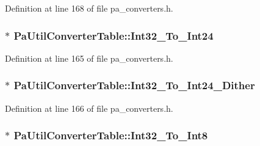 Definition at line 168 of file pa\+\_\+converters.\+h.

\subsubsection[{\texorpdfstring{Int32\+\_\+\+To\+\_\+\+Int24}{Int32_To_Int24}}]{$\ast$ Pa\+Util\+Converter\+Table\+::\+Int32\+\_\+\+To\+\_\+\+Int24}\hypertarget{struct_pa_util_converter_table_a374be7d29ed710b488d0980e540a3823}{}\label{struct_pa_util_converter_table_a374be7d29ed710b488d0980e540a3823}


Definition at line 165 of file pa\+\_\+converters.\+h.

\subsubsection[{\texorpdfstring{Int32\+\_\+\+To\+\_\+\+Int24\+\_\+\+Dither}{Int32_To_Int24_Dither}}]{$\ast$ Pa\+Util\+Converter\+Table\+::\+Int32\+\_\+\+To\+\_\+\+Int24\+\_\+\+Dither}\hypertarget{struct_pa_util_converter_table_a2e120380bc1f476c88805f4425eda05c}{}\label{struct_pa_util_converter_table_a2e120380bc1f476c88805f4425eda05c}


Definition at line 166 of file pa\+\_\+converters.\+h.

\subsubsection[{\texorpdfstring{Int32\+\_\+\+To\+\_\+\+Int8}{Int32_To_Int8}}]{$\ast$ Pa\+Util\+Converter\+Table\+::\+Int32\+\_\+\+To\+\_\+\+Int8}\hypertarget{struct_pa_util_converter_table_a7201612642789047cea27f922324c508}{}\label{struct_pa_util_converter_table_a7201612642789047cea27f922324c508}


